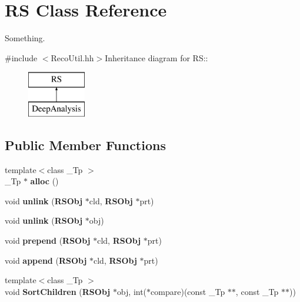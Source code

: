 \section{RS Class Reference}
\label{classRS}


Something.  


{\ttfamily \#include $<$RecoUtil.hh$>$}Inheritance diagram for RS::\begin{figure}[H]
\begin{center}
\leavevmode
\includegraphics[height=2cm]{classRS}
\end{center}
\end{figure}
\subsection*{Public Member Functions}
\begin{DoxyCompactItemize}
\item 
{\footnotesize template$<$class \_\-Tp $>$ }\\\_\-Tp $\ast$ {\bfseries alloc} ()\label{classRS_ac77e877da97d17cadbaa0684b6f10c58}

\item 
void {\bfseries unlink} ({\bf RSObj} $\ast$cld, {\bf RSObj} $\ast$prt)\label{classRS_add62222b166ede30bc242cf115059409}

\item 
void {\bfseries unlink} ({\bf RSObj} $\ast$obj)\label{classRS_af0e279ecf61559bc9719285a2a8fef0b}

\item 
void {\bfseries prepend} ({\bf RSObj} $\ast$cld, {\bf RSObj} $\ast$prt)\label{classRS_a0135830c1eef7c9c8666fc5ee98e5b2b}

\item 
void {\bfseries append} ({\bf RSObj} $\ast$cld, {\bf RSObj} $\ast$prt)\label{classRS_a1d9b09c9ad252a5211efe8009c205ac8}

\item 
{\footnotesize template$<$class \_\-Tp $>$ }\\void {\bfseries SortChildren} ({\bf RSObj} $\ast$obj, int($\ast$compare)(const \_\-Tp $\ast$$\ast$, const \_\-Tp $\ast$$\ast$))\label{classRS_a4888c2bb20b2ee1b1fd91d8b912ee7be}

\end{DoxyCompactItemize}
